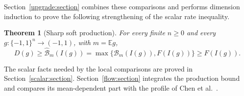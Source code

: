 \documentclass[11pt]{article}
\newtheorem{theorem}{Theorem}[section]
\theoremstyle{definition}
\theoremstyle{remark}
\newcommand{\E}{\mathbb E}
\numberwithin{equation}{section}
\begin{document}
Section~\ref{upgrade:section} combines these comparisons and performs
dimension induction to prove the following strengthening of the scalar
rate inequality.

\begin{theorem}[Sharp soft production]
\label{upgrade:production}
For every finite $n\ge0$ and every $g:\{-1,1\}^n\to(-1,1)$,
with $m=\E g$,
\begin{equation}
 D(g)\ge\widehat{\mathcal B}_m(I(g))
       =\max\{\mathcal B_m(I(g)),F(I(g))\}
       \ge F(I(g)).
 \label{upgrade:production-bound}
\end{equation}
\end{theorem}

The scalar facts needed by the local comparisons are proved in
Section~\ref{scalar:section}. Section~\ref{flow:section} integrates
the production bound and compares its mean-dependent part with the
profile of Chen et al.\ \cite{ChenEtAl2026CK}.











\end{document}

